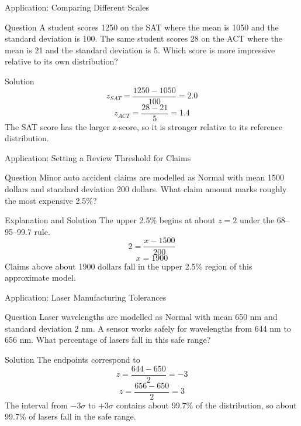 \documentclass[aspectratio=169]{beamer}
\begin{document}
\begin{frame}{Application: Comparing Different Scales}
\begin{block}{Question}
A student scores 1250 on the SAT where the mean is 1050 and the standard deviation is 100. The same student scores 28 on the ACT where the mean is 21 and the standard deviation is 5. Which score is more impressive relative to its own distribution?
\end{block}

\begin{block}{Solution}
$$z_{SAT}=\frac{1250-1050}{100}=2.0$$
$$z_{ACT}=\frac{28-21}{5}=1.4$$
The SAT score has the larger z-score, so it is stronger relative to its reference distribution.
\end{block}
\end{frame}

\begin{frame}{Application: Setting a Review Threshold for Claims}
\begin{block}{Question}
Minor auto accident claims are modelled as Normal with mean 1500 dollars and standard deviation 200 dollars. What claim amount marks roughly the most expensive 2.5\%?
\end{block}

\begin{block}{Explanation and Solution}
The upper 2.5\% begins at about $z=2$ under the 68--95--99.7 rule.
$$2=\frac{x-1500}{200}$$
$$x=1900$$
Claims above about 1900 dollars fall in the upper 2.5\% region of this approximate model.
\end{block}
\end{frame}

\begin{frame}{Application: Laser Manufacturing Tolerances}
\begin{block}{Question}
Laser wavelengths are modelled as Normal with mean 650 nm and standard deviation 2 nm. A sensor works safely for wavelengths from 644 nm to 656 nm. What percentage of lasers fall in this safe range?
\end{block}

\begin{block}{Solution}
The endpoints correspond to
$$z=\frac{644-650}{2}=-3$$
$$z=\frac{656-650}{2}=3$$
The interval from $-3\sigma$ to $+3\sigma$ contains about 99.7\% of the distribution, so about 99.7\% of lasers fall in the safe range.
\end{block}
\end{frame}
\end{document}
